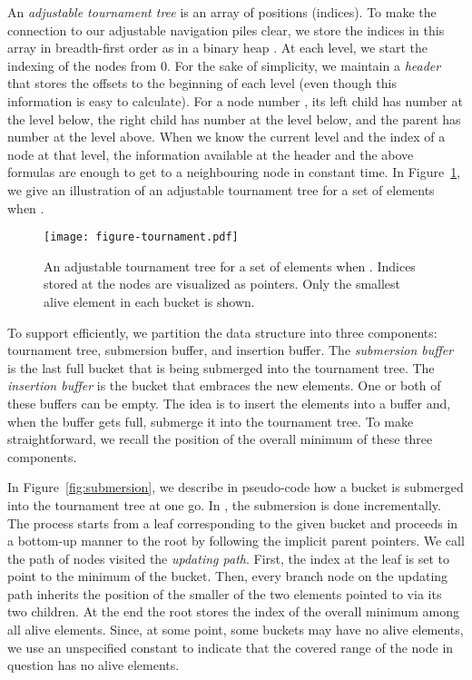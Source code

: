 \documentclass[final,onetabnum,onefignum,onethmnum]{siamltex}
\newcommand{\Minimum}{\mbox{}}
\newcommand{\Insert}{\mbox{}}
\begin{document}
An \emph{adjustable tournament tree} is an array of  positions (indices). 
To make the connection to our adjustable navigation piles clear, 
we store the indices in this array in breadth-first order as in a binary heap \cite{Wil64}. 
At each level, we start the indexing of the nodes  from
0. For the sake of simplicity, we maintain a \emph{header} that stores
the offsets to the beginning of each level (even though this
information is easy to calculate). For a node number , its
left child has number  at the level below, the right child has number  at the level below, 
and the parent has number  at the level above. When we know the current level and the index
of a node at that level, the information available at the header and the above formulas
are enough to get to a neighbouring node in constant time. In
Figure~\ref{fig:tournament}, we give an illustration of an adjustable tournament tree
for a set of  elements when .

\begin{figure}[tb!]
\begin{center}
\texttt{[image: figure-tournament.pdf]}
\end{center}

\caption{An adjustable tournament tree for a set of  elements
  when . Indices stored at the nodes are visualized as
  pointers. Only the smallest alive element in each bucket is shown.}
\label{fig:tournament}
\end{figure}

To support \Insert{} efficiently, we partition the data structure into
three components: tournament tree, submersion buffer, and
insertion buffer.  The \emph{submersion buffer} is the last full
bucket that is being submerged into the tournament tree. The
\emph{insertion buffer} is the bucket that embraces the new
elements. One or both of these buffers can be empty. The
idea is to insert the elements into a buffer and, when the buffer gets
full, submerge it into the tournament tree.  To make \Minimum{} 
straightforward, we recall the position of the overall
minimum of these three components.

In Figure~\ref{fig:submersion}, we describe in pseudo-code how a
bucket is submerged into the tournament tree at one go. In \Insert{},
the submersion is done incrementally. The process starts from a leaf
corresponding to the given bucket and proceeds in a bottom-up manner
to the root by following the implicit parent pointers.  We call the
path of nodes visited the \emph{updating path}. First, the index at
the leaf is set to point to the minimum of the bucket. Then, every
branch node on the updating path inherits the position of the smaller
of the two elements pointed to via its two children.  At the end the
root stores the index of the overall minimum among all alive
elements. Since, at some point, some buckets may have no alive elements, 
we use an unspecified constant  to indicate that the  
covered range of the node in question has no alive elements.
\end{document}
